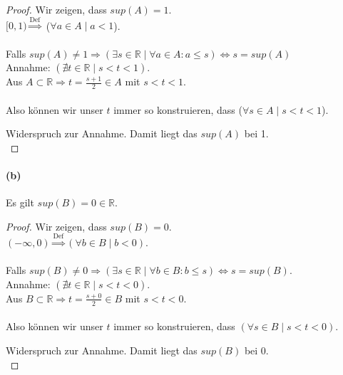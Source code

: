 \documentclass[12pt, letterpaper]{article}
\begin{document}
\begin{proof}

Wir zeigen, dass $sup(A) = 1$.\\

\noindent $[0, 1) \overset{\text{Def}}{\Rightarrow}$ ($\forall a \in A \mid a < 1$).\\ \\
\noindent Falls $sup(A) \neq 1 \Rightarrow (\exists s \in \mathbb{R} \mid \forall a \in A: a \leq s) \Leftrightarrow s = sup(A)$\\

\noindent Annahme: $(\nexists t \in \mathbb{R} \mid s < t < 1)$.\\


\noindent Aus $A \subset \mathbb{R} \Rightarrow t = \frac{s+1}{2} \in A$ mit $s < t < 1$.\\ \\
Also können wir unser $t$ immer so konstruieren, dass ($\forall s \in A \mid s < t < 1$). 

\noindent Widerspruch zur Annahme. Damit liegt das $sup(A)$ bei 1.\\

\end{proof} 

\paragraph{(b)} Es gilt $sup(B) = 0 \in \mathbb{R}$.

\begin{proof}

Wir zeigen, dass $sup(B) = 0$.\\

\noindent $(-\infty, 0) \overset{\text{Def}}{\Rightarrow} (\forall b \in B \mid b < 0)$.\\ \\
\noindent Falls $sup(B) \neq 0 \Rightarrow (\exists s \in \mathbb{R} \mid \forall b \in B: b \leq s) \Leftrightarrow s = sup(B)$.\\

\noindent Annahme: $(\nexists t \in \mathbb{R} \mid s < t < 0)$.\\

\noindent Aus $B \subset \mathbb{R} \Rightarrow t = \frac{s+0}{2} \in B$ mit $s < t < 0$.\\ \\
Also können wir unser $t$ immer so konstruieren, dass $(\forall s \in B \mid s < t < 0)$. 

\noindent Widerspruch zur Annahme. Damit liegt das $sup(B)$ bei 0.\\
\end{proof}
\end{document}
